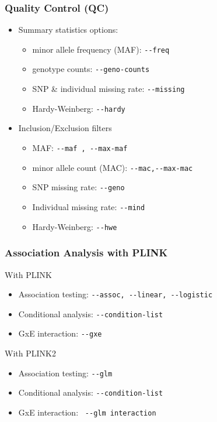 \documentclass{beamer}
\begin{document}
\begin{frame}[fragile]
\frametitle{\bf Quality Control (QC)}
\begin{itemize}
\item Summary statistics options:
\begin{itemize}
\item  minor allele frequency (MAF): \verb+--freq +
\item  genotype counts: \verb+--geno-counts +
\item  SNP \&  individual missing rate:  \verb+--missing +
\item  Hardy-Weinberg:  \verb+--hardy +
\end{itemize}
\item Inclusion/Exclusion filters
\begin{itemize}
\item MAF:   \verb+--maf , --max-maf+
\item minor allele count (MAC):   \verb+--mac,--max-mac+
\item  SNP missing rate: \verb+--geno +
\item Individual missing rate:  \verb+--mind +
\item  Hardy-Weinberg:   \verb+--hwe +
\end{itemize}
\end{itemize}
\end{frame}



\begin{frame}[fragile]
\frametitle{\bf Association Analysis with PLINK}
With PLINK
\begin{itemize}
\item Association testing: \verb+--assoc, --linear, --logistic+
\item Conditional analysis: \verb+--condition-list+
\item GxE interaction: \verb+--gxe +
\end{itemize}
\vspace{1em}
With PLINK2
\begin{itemize}
	\item Association testing: \verb+--glm+
	\item Conditional analysis: \verb+--condition-list+
	\item GxE interaction: \verb+ --glm interaction +
\end{itemize}
\end{frame}
\end{document}
